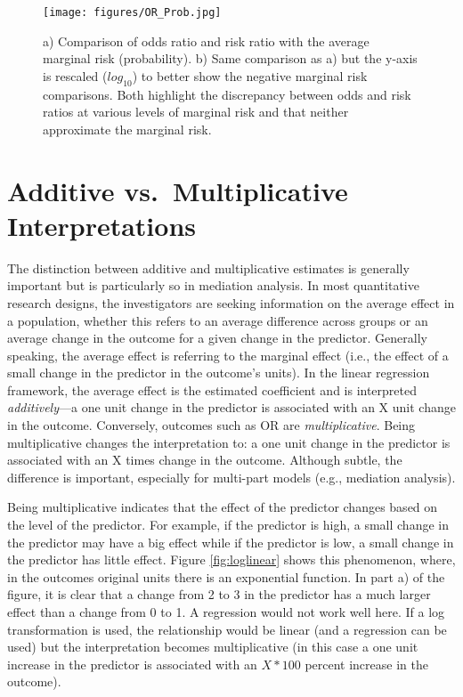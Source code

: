 \documentclass[]{DissertateUSU}
\begin{document}
\begin{figure}[tb]
  \centering
  \texttt{[image: figures/OR\_Prob.jpg]}
  \caption{a) Comparison of odds ratio and risk ratio with the average marginal risk (probability). b) Same comparison as a) but the y-axis is rescaled ($log_{10}$) to better show the negative marginal risk comparisons. Both highlight the discrepancy between odds and risk ratios at various levels of marginal risk and that neither approximate the marginal risk.}
  \label{fig:orprob}
\end{figure}

\section{Additive vs.~Multiplicative
Interpretations}\label{additive-vs.multiplicative-interpretations}

The distinction between additive and multiplicative estimates is
generally important but is particularly so in mediation analysis. In
most quantitative research designs, the investigators are seeking
information on the average effect in a population, whether this refers
to an average difference across groups or an average change in the
outcome for a given change in the predictor. Generally speaking, the
average effect is referring to the marginal effect (i.e., the effect of
a small change in the predictor in the outcome's units). In the linear
regression framework, the average effect is the estimated coefficient
and is interpreted \emph{additively}---a one unit change in the
predictor is associated with an X unit change in the outcome.
Conversely, outcomes such as OR are \emph{multiplicative}. Being
multiplicative changes the interpretation to: a one unit change in the
predictor is associated with an X times change in the outcome. Although
subtle, the difference is important, especially for multi-part models
(e.g., mediation analysis).

Being multiplicative indicates that the effect of the predictor changes
based on the level of the predictor. For example, if the predictor is
high, a small change in the predictor may have a big effect while if the
predictor is low, a small change in the predictor has little effect.
Figure \ref{fig:loglinear} shows this phenomenon, where, in the outcomes
original units there is an exponential function. In part a) of the
figure, it is clear that a change from 2 to 3 in the predictor has a
much larger effect than a change from 0 to 1. A regression would not
work well here. If a log transformation is used, the relationship would
be linear (and a regression can be used) but the interpretation becomes
multiplicative (in this case a one unit increase in the predictor is
associated with an \(X*100\) percent increase in the outcome).
\end{document}
